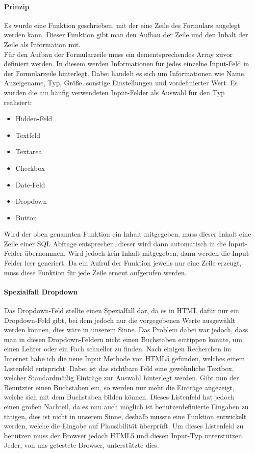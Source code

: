 \paragraph{Prinzip}
Es wurde eine Funktion geschrieben, mit der eine Zeile des Formulars angelegt werden kann. Dieser Funktion gibt man den Aufbau der Zeile und den Inhalt der Zeile als Information mit.\\
Für den Aufbau der Formularzeile muss ein dementsprechendes Array zuvor definiert werden. In diesem werden Informationen für jedes einzelne Input-Feld in der Formularzeile hinterlegt. Dabei handelt es sich um Informationen wie Name, Anzeigename, Typ, Größe, sonstige Einstellungen und vordefinierter Wert. Es wurden die am häufig verwendeten  Input-Felder als Auswahl für den Typ realisiert:
\begin{itemize}
	\item Hidden-Feld
	\item Textfeld
	\item Textarea
	\item Checkbox
	\item Date-Feld
	\item Dropdown
	\item Button
\end{itemize}
Wird der oben genannten Funktion ein Inhalt mitgegeben, muss dieser Inhalt eine Zeile einer SQL Abfrage entsprechen, dieser wird dann automatisch in die Input-Felder übernommen. Wird jedoch kein Inhalt mitgegeben, dann werden die Input-Felder leer generiert. Da ein Aufruf der Funktion jeweils nur eine Zeile erzeugt, muss diese Funktion für jede Zeile erneut aufgerufen werden.
\paragraph{Spezialfall Dropdown}
Das Dropdown-Feld stellte einen Spezialfall dar, da es in HTML dafür nur ein Dropdown-Feld gibt, bei dem jedoch nur die vorgegebenen Werte ausgewählt werden können, dies wäre in unserem Sinne. Das Problem dabei war jedoch, dass man in diesen Dropdown-Feldern nicht einen Buchstaben eintippen konnte, um einen Lehrer oder ein Fach schneller zu finden. Nach einigen Recherchen im Internet habe ich die neue Input Methode von HTML5 gefunden, welches einem Listenfeld entspricht. Dabei ist das sichtbare Feld eine gewöhnliche Textbox, welcher Standardmäßig Einträge zur Auswahl hinterlegt werden. Gibt nun der Benutzter einen Buchstaben ein, so werden nur mehr die Einträge angezeigt, welche sich mit dem Buchstaben bilden können. Dieses Listenfeld hat jedoch einen großen Nachteil, da es nun auch möglich ist benutzerdefinierte Eingaben zu tätigen, dies ist nicht in unserem Sinne, deshalb musste eine Funktion entwickelt werden, welche die Eingabe auf Plausibilität überprüft. Um dieses Listenfeld zu benützen muss der Browser jedoch HTML5 und diesen Input-Typ unterstützen. Jeder, von uns getestete Browser, unterstützte dies.
